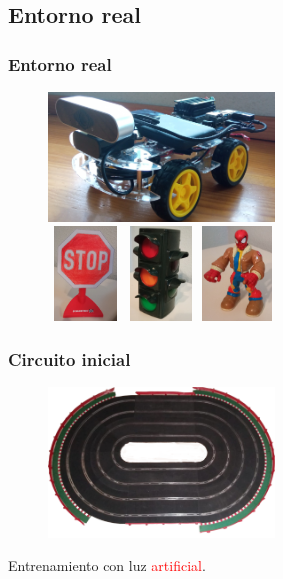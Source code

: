 \documentclass{beamer}
\begin{document}
\subsection{Entorno real}
\begin{frame}
	\frametitle{Entorno real}
	\begin{figure}
		\centering
		\includegraphics[width=6cm]{figs/robot}\vspace{0.5cm}\\
		\includegraphics[width=2cm, height=2.5cm]{figs/realstopsign}\hspace{0.7cm}\includegraphics[width=2cm,
			height=2.5cm]{figs/realtrafficlight}\hspace{0.7cm}\includegraphics[width=2cm, height=2.5cm]{figs/realpedestrian}
	\end{figure}
\end{frame}

\begin{frame}
	\frametitle{Circuito inicial}
	\begin{figure}
		\centering
		\includegraphics[width=6cm]{figs/circuit}
	\end{figure}
	\begin{outline}
		\1 Entrenamiento con luz \textcolor{red}{artificial}.
	\end{outline}
\end{frame}
\end{document}
